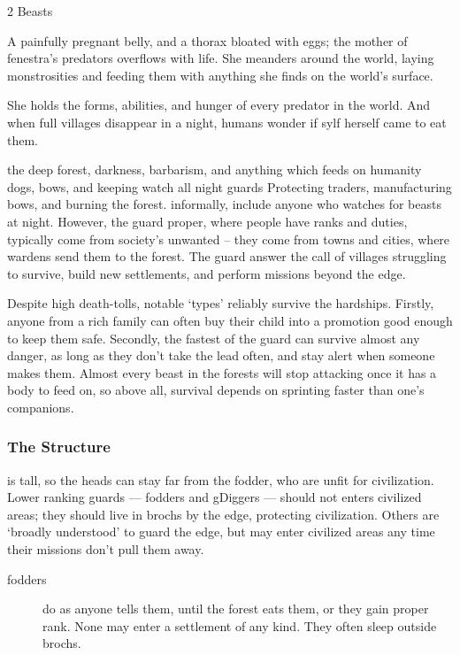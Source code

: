 \begin{multicols}{2}
  {Beasts}%
  {%
    A painfully pregnant belly, and a thorax bloated with eggs; the mother of \gls{fenestra}'s predators overflows with life.
    She meanders around the world, laying monstrosities and feeding them with anything she finds on the world's surface.

    She holds the forms, abilities, and hunger of every predator in the world.
    And when full \glspl{village} disappear in a night, humans wonder if \gls{sylf} herself came to eat them.
  }%
  {the deep forest, darkness, barbarism, and anything which feeds on humanity}%
  {dogs, bows, and keeping watch all night}%
  {\Glspl{guard}}%
  {
    Protecting traders, manufacturing bows, and burning the forest.
  }%
informally, include anyone who watches for beasts at night.
However, the \gls{guard} proper, where people have ranks and duties, typically come from society's unwanted -- they come from towns and cities, where \glspl{warden} send them to the forest.
The \gls{guard} answer the call of \glspl{village} struggling to survive, build new settlements, and perform missions beyond the \gls{edge}.

Despite high death-tolls, notable `types' reliably survive the hardships.
Firstly, anyone from a rich family can often buy their child into a promotion good enough to keep them safe.
Secondly, the fastest of the \gls{guard} can survive almost any danger, as long as they don't take the lead often, and stay alert when someone makes them.
Almost every beast in the forests will stop attacking once it has a body to feed on, so above all, survival depends on sprinting faster than one's companions.

\subsubsection{The Structure}
is tall, so the heads can stay far from the fodder, who are unfit for civilization.
Lower ranking \glspl{guard} --- \glspl{fodder} and \glspl{gDigger} --- should not enters civilized areas; they should live in \glspl{broch} by the \gls{edge}, protecting civilization.
Others are `broadly understood' to guard the \gls{edge}, but may enter civilized areas any time their missions don't pull them away.

\begin{description}
  \item[\Glspl{fodder}]
  \label{fodder}%
  do as anyone tells them, until the forest eats them, or they gain proper rank.
  None may enter a settlement of any kind.
  They often sleep outside \glspl{broch}.


\end{description}
\end{multicols}
